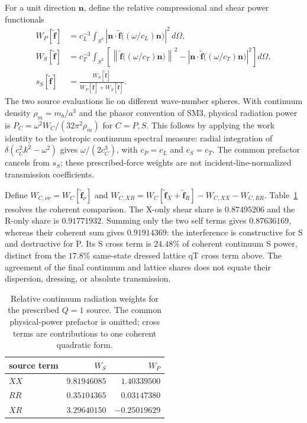 \documentclass[10pt,aps,onecolumn,notitlepage,nofootinbib]{revtex4-2}
\newcommand{\vf}{\bm f}
\begin{document}
For a unit direction $\bm n$, define the relative compressional and shear power functionals
\begin{align}
 W_P[\widetilde{\vf}]&=c_L^{-3}\int_{S^2}
 \left|\bm n\cdot\widetilde{\vf}\bigl((\omega/c_L)\bm n\bigr)\right|^2\,d\Omega,\nonumber\\
 W_S[\widetilde{\vf}]&=c_T^{-3}\int_{S^2}
 \left[\left\|\widetilde{\vf}\bigl((\omega/c_T)\bm n\bigr)\right\|^2
 -\left|\bm n\cdot\widetilde{\vf}\bigl((\omega/c_T)\bm n\bigr)\right|^2\right]d\Omega,\nonumber\\
 s_S[\widetilde{\vf}]&=\frac{W_S[\widetilde{\vf}]}{W_P[\widetilde{\vf}]+W_S[\widetilde{\vf}]}.
 \label{eq:sm-continuum-weights}
\end{align}
The two source evaluations lie on different wave-number spheres. With continuum density $\rho_m=m_b/a^3$ and the phasor convention of SM3, physical radiation power is $P_C=\omega^2W_C/(32\pi^2\rho_m)$ for $C=P,S$. This follows by applying the work identity to the isotropic continuum spectral measure: radial integration of $\delta(c_C^2k^2-\omega^2)$ gives $\omega/(2c_C^3)$, with $c_P=c_L$ and $c_S=c_T$. The common prefactor cancels from $s_S$; these prescribed-force weights are not incident-line-normalized transmission coefficients.

Define $W_{C,\nu\nu}=W_C[\widetilde{\vf}_\nu]$ and $W_{C,XR}=W_C[\widetilde{\vf}_X+\widetilde{\vf}_R]-W_{C,XX}-W_{C,RR}$. Table~\ref{tab:sm-continuum-interference} resolves the coherent comparison. The X-only shear share is $0.87495206$ and the R-only share is $0.91771932$. Summing only the two self terms gives $0.87636169$, whereas their coherent sum gives $0.91914369$: the interference is constructive for S and destructive for P. Its S cross term is $24.48\%$ of coherent continuum S power, distinct from the $17.8\%$ same-state dressed lattice qT cross term above. The agreement of the final continuum and lattice shares does not equate their dispersion, dressing, or absolute transmission.

\begin{table}[htbp]
\caption{Relative continuum radiation weights for the prescribed $Q=1$ source. The common physical-power prefactor is omitted; cross terms are contributions to one coherent quadratic form.}
\label{tab:sm-continuum-interference}
\begin{ruledtabular}
\begin{tabular}{lrr}
source term & $W_S$ & $W_P$\\\hline
$XX$ & $9.81946085$ & $1.40339500$\\
$RR$ & $0.35104365$ & $0.03147380$\\
$XR$ & $3.29640150$ & $-0.25019629$\\
\end{tabular}
\end{ruledtabular}
\end{table}
\end{document}
